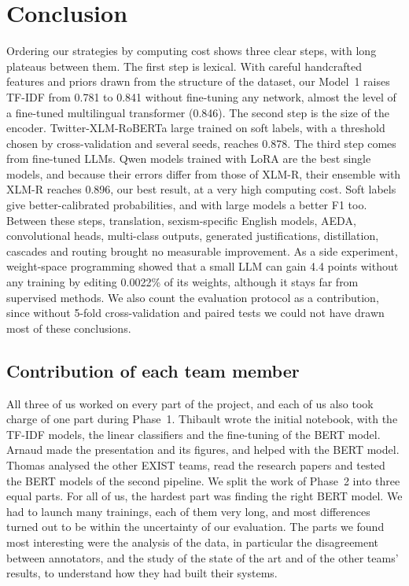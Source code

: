 \documentclass[pdflatex,sn-mathphys-num]{sn-jnl}
\begin{document}
\section{Conclusion}\label{sec:conclusion}

Ordering our strategies by computing cost shows three clear steps, with long plateaus between them. The first step is lexical. With careful handcrafted features and priors drawn from the structure of the dataset, our Model~1 raises TF-IDF from 0.781 to 0.841 without fine-tuning any network, almost the level of a fine-tuned multilingual transformer (0.846). The second step is the size of the encoder. Twitter-XLM-RoBERTa large trained on soft labels, with a threshold chosen by cross-validation and several seeds, reaches 0.878. The third step comes from fine-tuned LLMs. Qwen models trained with LoRA are the best single models, and because their errors differ from those of XLM-R, their ensemble with XLM-R reaches 0.896, our best result, at a very high computing cost. Soft labels give better-calibrated probabilities, and with large models a better F1 too. Between these steps, translation, sexism-specific English models, AEDA, convolutional heads, multi-class outputs, generated justifications, distillation, cascades and routing brought no measurable improvement. As a side experiment, weight-space programming showed that a small LLM can gain 4.4 points without any training by editing 0.0022\% of its weights, although it stays far from supervised methods. We also count the evaluation protocol as a contribution, since without 5-fold cross-validation and paired tests we could not have drawn most of these conclusions.

\subsection{Contribution of each team member}

All three of us worked on every part of the project, and each of us also took charge of one part during Phase~1. Thibault wrote the initial notebook, with the TF-IDF models, the linear classifiers and the fine-tuning of the BERT model. Arnaud made the presentation and its figures, and helped with the BERT model. Thomas analysed the other EXIST teams, read the research papers and tested the BERT models of the second pipeline. We split the work of Phase~2 into three equal parts. For all of us, the hardest part was finding the right BERT model. We had to launch many trainings, each of them very long, and most differences turned out to be within the uncertainty of our evaluation. The parts we found most interesting were the analysis of the data, in particular the disagreement between annotators, and the study of the state of the art and of the other teams' results, to understand how they had built their systems.
\end{document}
